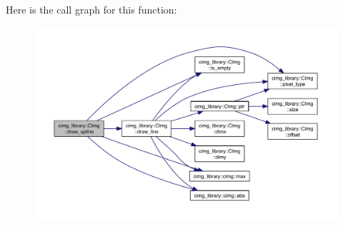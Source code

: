 Here is the call graph for this function\-:
\nopagebreak
\begin{figure}[H]
\begin{center}
\leavevmode
\includegraphics[width=350pt]{structcimg__library_1_1_c_img_ae38af70acd02e1b9530ab5b78d1f5d44_cgraph}
\end{center}
\end{figure}


